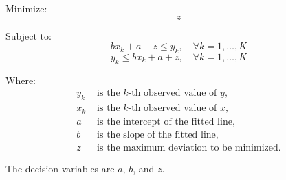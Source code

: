 \documentclass{article}
\begin{document}
Minimize:
\[
z
\]

Subject to:
\[
bx_k + a - z \leq y_k, \quad \forall k = 1, \ldots, K
\]
\[
y_k \leq bx_k + a + z, \quad \forall k = 1, \ldots, K
\]

Where:
\begin{align*}
y_k & \text{ is the } k\text{-th observed value of } y, \\
x_k & \text{ is the } k\text{-th observed value of } x, \\
a & \text{ is the intercept of the fitted line,} \\
b & \text{ is the slope of the fitted line,} \\
z & \text{ is the maximum deviation to be minimized.}
\end{align*}

The decision variables are \( a \), \( b \), and \( z \).
\end{document}
